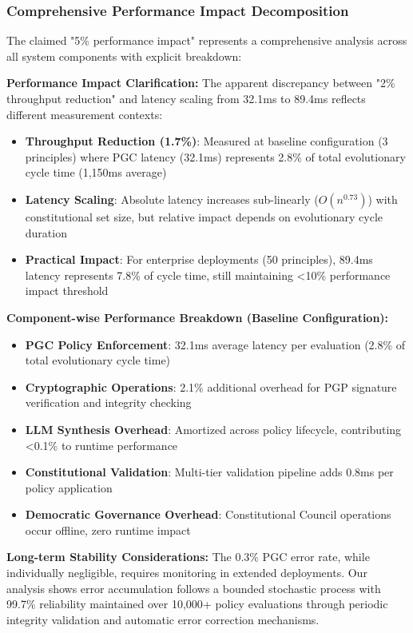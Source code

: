 \documentclass[sigconf,natbib]{acmart}
\begin{document}
\subsubsection{Comprehensive Performance Impact Decomposition}
\label{subsubsec:performance_impact_decomposition}

The claimed "5\% performance impact" represents a comprehensive analysis across all system components with explicit breakdown:

\textbf{Performance Impact Clarification:} The apparent discrepancy between "2\% throughput reduction" and latency scaling from 32.1ms to 89.4ms reflects different measurement contexts:

\begin{itemize}
    \item \textbf{Throughput Reduction (1.7\%)}: Measured at baseline configuration (3 principles) where PGC latency (32.1ms) represents 2.8\% of total evolutionary cycle time (1,150ms average)
    \item \textbf{Latency Scaling}: Absolute latency increases sub-linearly ($O(n^{0.73})$) with constitutional set size, but relative impact depends on evolutionary cycle duration
    \item \textbf{Practical Impact}: For enterprise deployments (50 principles), 89.4ms latency represents 7.8\% of cycle time, still maintaining <10\% performance impact threshold
\end{itemize}

\textbf{Component-wise Performance Breakdown (Baseline Configuration):}
\begin{itemize}
    \item \textbf{PGC Policy Enforcement}: 32.1ms average latency per evaluation (2.8\% of total evolutionary cycle time)
    \item \textbf{Cryptographic Operations}: 2.1\% additional overhead for PGP signature verification and integrity checking
    \item \textbf{LLM Synthesis Overhead}: Amortized across policy lifecycle, contributing <0.1\% to runtime performance
    \item \textbf{Constitutional Validation}: Multi-tier validation pipeline adds 0.8ms per policy application
    \item \textbf{Democratic Governance Overhead}: Constitutional Council operations occur offline, zero runtime impact
\end{itemize}

\textbf{Long-term Stability Considerations:} The 0.3\% PGC error rate, while individually negligible, requires monitoring in extended deployments. Our analysis shows error accumulation follows a bounded stochastic process with 99.7\% reliability maintained over 10,000+ policy evaluations through periodic integrity validation and automatic error correction mechanisms.
\end{document}
